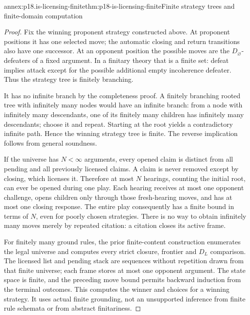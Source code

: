 \begin{annexitem}{annex:p18.is-licensing-finite}{thm:p18-is-licensing-finite}{Finite strategy trees and finite-domain computation}
\begin{proof}
Fix the winning proponent strategy constructed above.
At proponent positions it has one selected move; the automatic
closing and return transitions also have one successor.
At an opponent position the possible moves are the
\(D_\varnothing\)-defeaters of a fixed argument.
In a finitary theory that is a finite set: defeat implies attack
except for the possible additional empty incoherence defeater.
Thus the strategy tree is finitely branching.

It has no infinite branch by the completeness proof.
A finitely branching rooted tree with infinitely many nodes
would have an infinite branch: from a node with infinitely
many descendants, one of its finitely many children has
infinitely many descendants; choose it and repeat.
Starting at the root yields a contradictory infinite path.
Hence the winning strategy tree is finite.
The reverse implication follows from general soundness.

If the universe has \(N<\infty\) arguments, every opened claim
is distinct from all pending and all previously licensed claims.
A claim is never removed except by closing, which licenses it.
Therefore at most \(N\) hearings, counting the initial root,
can ever be opened during one play.
Each hearing receives at most one opponent challenge, opens
children only through those fresh-hearing moves, and has at most
one closing response. The entire play consequently has a finite
bound in terms of \(N\), even for poorly chosen strategies.
There is no way to obtain infinitely many moves merely by
repeated citation: a citation closes its active frame.

For finitely many ground rules, the prior finite-content
construction enumerates the legal universe and computes every
strict closure, frontier and \(D_L\) comparison.
The licensed list and pending stack are sequences without
repetition drawn from that finite universe; each frame stores
at most one opponent argument. The state space is finite,
and the preceding move bound permits backward induction from
the terminal outcomes. This computes the winner and choices
for a winning strategy. It uses actual finite grounding,
not an unsupported inference from finite rule schemata or
from abstract finitariness.
\end{proof}
\end{annexitem}

